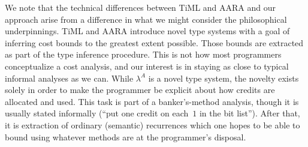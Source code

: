 We note that the technical differences between TiML and AARA and our
approach arise from a difference in what we might consider the
philosophical underpinnings.  TiML and AARA introduce novel type systems
with a goal of inferring cost bounds to the greatest extent possible.  Those
bounds are extracted as part of the type inference procedure.  This is not
how most programmers conceptualize a cost analysis, and our
interest is in staying as close to typical informal analyses as we can.
While $\lambda^A$ is a novel type system, the novelty exists solely in order
to make the programmer be explicit about how credits are allocated and used.
This task is part of a banker's-method analysis, though it is usually stated
informally (``put one credit on each~$1$ in the bit list'').  After that, it
is extraction of ordinary (semantic) recurrences which one hopes to be able
to bound using whatever methods are at the programmer's disposal.

